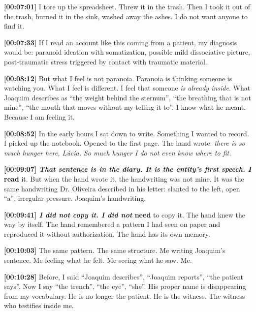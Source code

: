 \noindent \textbf{[00:07:01]} I tore up the spreadsheet. Threw it in the trash. Then I took it out of the trash, burned it in the sink, washed away the ashes. I do not want anyone to find it.

\noindent \textbf{[00:07:33]} If I read an account like this coming from a patient, my diagnosis would be: paranoid ideation with somatization, possible mild dissociative picture, post-traumatic stress triggered by contact with traumatic material.

\noindent \textbf{[00:08:12]} But what I feel is not paranoia. Paranoia is thinking someone is watching you. What I feel is different. I feel that someone \textit{is already inside}. What Joaquim describes as \textquotedblleft{}the weight behind the sternum\textquotedblright{}, \textquotedblleft{}the breathing that is not mine\textquotedblright{}, \textquotedblleft{}the mouth that moves without my telling it to\textquotedblright{}. I know what he meant. Because I am feeling it.

\noindent \textbf{[00:08:52]} In the early hours I sat down to write. Something I wanted to record. I picked up the notebook. Opened to the first page. The hand wrote: \textit{there is so much hunger here, Lúcia. So much hunger I do not even know where to fit.}

\noindent \textbf{[00:09:07]\textit{ That sentence is in the diary. It is the entity's first speech. I }read} it. But when the hand wrote it, the handwriting was not mine. It was the same handwriting Dr. Oliveira described in his letter: slanted to the left, open \textquotedblleft{}a\textquotedblright{}, irregular pressure. Joaquim's handwriting.

\noindent \textbf{[00:09:41]\textit{ I did not copy it. I did not }need} to copy it. The hand knew the way by itself. The hand remembered a pattern I had seen on paper and reproduced it without authorization. The hand has its own memory.

\noindent \textbf{[00:10:03]} The same pattern. The same structure. Me writing Joaquim's sentence. Me feeling what he felt. Me seeing what he saw. Me.

\noindent \textbf{[00:10:28]} Before, I said \textquotedblleft{}Joaquim describes\textquotedblright{}, \textquotedblleft{}Joaquim reports\textquotedblright{}, \textquotedblleft{}the patient says\textquotedblright{}. Now I say \textquotedblleft{}the trench\textquotedblright{}, \textquotedblleft{}the eye\textquotedblright{}, \textquotedblleft{}she\textquotedblright{}. His proper name is disappearing from my vocabulary. He is no longer the patient. He is the witness. The witness who testifies inside me.

